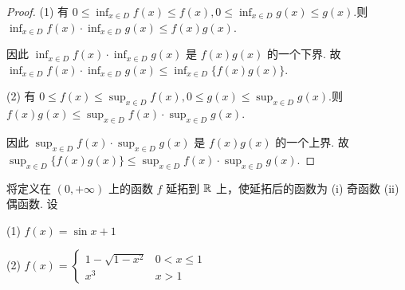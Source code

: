 \begin{proof}
    (1) 有 $0 \le \inf_{x\in D} f(x) \le f(x),0\le \inf_{x\in D} g(x) \le g(x)$.则 $\inf_{x\in D} f(x) \cdot \inf_{x\in D} g(x) \le f(x)g(x)$. 
    
    因此 $\inf_{x\in D} f(x) \cdot \inf_{x\in D} g(x)$ 是 $f(x)g(x)$ 的一个下界.  故 $\inf_{x\in D} f(x) \cdot \inf_{x\in D} g(x) \le \inf_{x\in D} \{f(x)g(x)\}$.
    
    (2)  有 $0 \le f(x) \le \sup_{x\in D} f(x),0\le g(x) \le \sup_{x\in D} g(x) $.则 $f(x)g(x) \le \sup_{x\in D} f(x) \cdot \sup_{x\in D} g(x)$. 
    
    因此 $\sup_{x\in D} f(x) \cdot \sup_{x\in D} g(x)$ 是 $f(x)g(x)$ 的一个上界.  故 $\sup_{x\in D} \{f(x)g(x)\} \le \sup_{x\in D} f(x) \cdot \sup_{x\in D} g(x)$.
\end{proof}

\begin{practice}
    将定义在 $(0,+\infty)$ 上的函数 $f$ 延拓到 $\mathbb{R}$ 上，使延拓后的函数为 (i) 奇函数 (ii)偶函数. 设 

    (1) $f(x)=\sin x+1$

    (2) $f(x)=\begin{cases}
        1-\sqrt{1-x^2} & 0<x\le 1 \\ 
        x^3 & x>1
    \end{cases}$
\end{practice}


